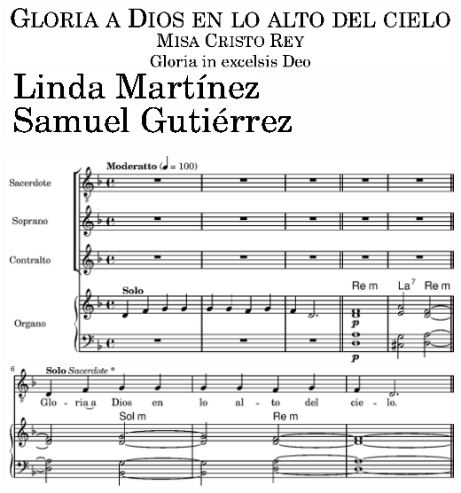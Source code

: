 \includegraphics{99/lily-924018f8-1}%
\ifx\betweenLilyPondSystem \undefined
  \linebreak
\else
  \expandafter{}%
\fi
\includegraphics{99/lily-924018f8-2}%
\ifx\betweenLilyPondSystem \undefined
  \linebreak
\else
  \expandafter{}%
\fi
\includegraphics{99/lily-924018f8-3}%
\ifx\betweenLilyPondSystem \undefined
  \linebreak
\else
  \expandafter{}%
\fi
\includegraphics{99/lily-924018f8-4}%
\ifx\betweenLilyPondSystem \undefined
  \linebreak
\else
  \expandafter{}%
\fi
\includegraphics{99/lily-924018f8-5}%
\ifx\betweenLilyPondSystem \undefined
  \linebreak
\else
  \expandafter{}%
\fi
\includegraphics{99/lily-924018f8-6}%
\ifx\betweenLilyPondSystem \undefined
